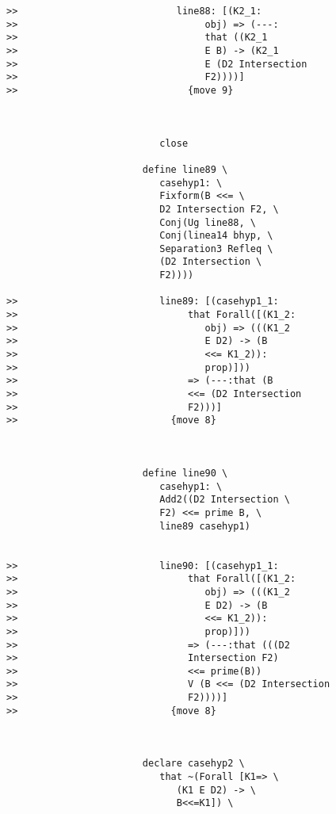 \documentclass[12pt]{article}
\begin{document}
\begin{verbatim}
>>                            line88: [(K2_1:
>>                                 obj) => (---:
>>                                 that ((K2_1
>>                                 E B) -> (K2_1
>>                                 E (D2 Intersection
>>                                 F2))))]
>>                              {move 9}



                           close

                        define line89 \
                           casehyp1: \
                           Fixform(B <<= \
                           D2 Intersection F2, \
                           Conj(Ug line88, \
                           Conj(linea14 bhyp, \
                           Separation3 Refleq \
                           (D2 Intersection \
                           F2))))

>>                         line89: [(casehyp1_1:
>>                              that Forall([(K1_2:
>>                                 obj) => (((K1_2
>>                                 E D2) -> (B
>>                                 <<= K1_2)):
>>                                 prop)]))
>>                              => (---:that (B
>>                              <<= (D2 Intersection
>>                              F2)))]
>>                           {move 8}



                        define line90 \
                           casehyp1: \
                           Add2((D2 Intersection \
                           F2) <<= prime B, \
                           line89 casehyp1)


>>                         line90: [(casehyp1_1:
>>                              that Forall([(K1_2:
>>                                 obj) => (((K1_2
>>                                 E D2) -> (B
>>                                 <<= K1_2)):
>>                                 prop)]))
>>                              => (---:that (((D2
>>                              Intersection F2)
>>                              <<= prime(B))
>>                              V (B <<= (D2 Intersection
>>                              F2))))]
>>                           {move 8}



                        declare casehyp2 \
                           that ~(Forall [K1=> \
                              (K1 E D2) -> \
                              B<<=K1]) \
                           




\end{verbatim}
\end{document}
